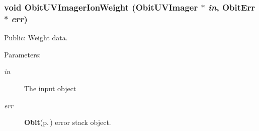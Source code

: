 \subsubsection{\setlength{\rightskip}{0pt plus 5cm}void Obit\-UVImager\-Ion\-Weight ({\bf Obit\-UVImager} $\ast$ {\em in}, {\bf Obit\-Err} $\ast$ {\em err})}\label{ObitUVImagerIon_8h_a11}


Public: Weight data. 

\begin{Desc}
\item[Parameters:]
\begin{description}
\item[{\em in}]The input object \item[{\em err}]{\bf Obit}{\rm (p.\,\pageref{structObit})} error stack object. \end{description}
\end{Desc}
